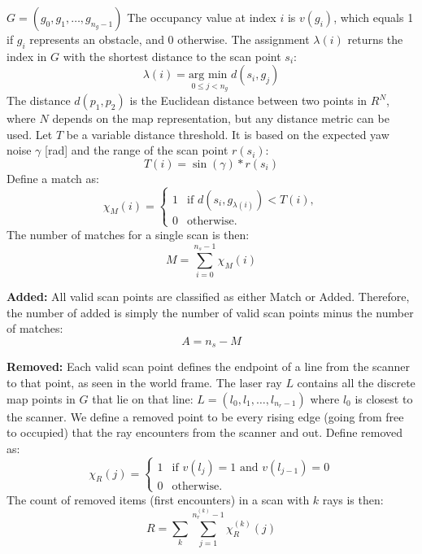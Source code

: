 \documentclass[conference]{IEEEtran}
\begin{document}
$G = (g_0, g_1, \dots, g_{n_g-1})$
The occupancy value at index $i$ is $v(g_i)$, which equals 1 if $g_i$ represents an obstacle, and 0 otherwise.
The assignment $\lambda(i)$ returns the index in $G$ with the shortest distance to the scan point $s_i$:
\begin{equation}
\lambda(i)=\underset{0\le j<n_g}{\text{arg min }}d(s_i,g_j)
\end{equation}
The distance $d(p_1, p_2)$ is the Euclidean distance between two points in $R^N$, where $N$ depends on the map representation, but any distance metric can be used.
Let $T$ be a variable distance threshold. It is based on the expected yaw noise $\gamma$ [rad] and the range of the scan point $r(s_i)$:
\begin{equation}
T(i)=\sin(\gamma)*r(s_i)
\end{equation}
Define a match as:
\begin{equation}
\chi_M(i) = \begin{cases} 1 & \text{if } d(s_i, g_{\lambda(i)}) < T(i), \\ 0 & \text{otherwise}. \end{cases}
\end{equation}
The number of matches for a single scan is then:
\begin{equation}
M = \sum_{i=0}^{n_s-1} \chi_M(i)
\end{equation}

\textbf{Added:}
All valid scan points are classified as either Match or Added. Therefore, the number of added is simply the number of valid scan points minus the number of matches:
\begin{equation}
A = n_s - M
\end{equation}

\textbf{Removed:}
Each valid scan point defines the endpoint of a line from the scanner to that point, as seen in the world frame.
The laser ray $L$ contains all the discrete map points in $G$ that lie on that line:
$L = (l_0, l_1, \dots, l_{n_r-1})$ where $l_0$ is closest to the scanner.
We define a removed point to be every rising edge (going from free to occupied) that the ray encounters from the scanner and out.
Define removed as:
\begin{equation}
\chi_R(j) = \begin{cases} 1 & \text{if } v(l_j) = 1 \text{ and } v(l_{j-1}) = 0 \\ 0 & \text{otherwise}. \end{cases}
\end{equation}
The count of removed items (first encounters) in a scan with $k$ rays is then:
\begin{equation}
R = \sum_{k}\sum_{j=1}^{n_r^{(k)}-1} \chi_R^{(k)}(j)
\end{equation}
\end{document}
